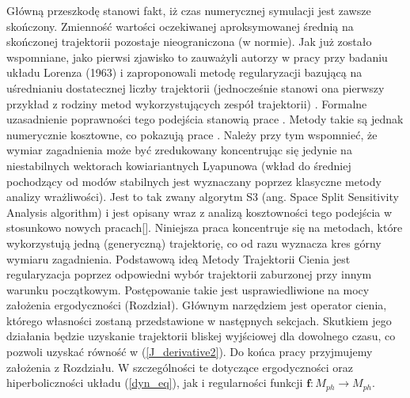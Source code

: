 \documentclass[12pt]{article}
\begin{document}
Główną przeszkodę stanowi fakt, iż czas numerycznej symulacji jest zawsze skończony. Zmienność wartości oczekiwanej aproksymowanej średnią na skończonej trajektorii pozostaje nieograniczona (w normie). Jak już zostało wspomniane, jako pierwsi zjawisko to zauważyli autorzy w pracy \cite{Lea1} przy badaniu układu Lorenza (1963) i zaproponowali metodę regularyzacji bazującą na uśrednianiu dostatecznej liczby trajektorii (jednocześnie stanowi ona pierwszy przykład z rodziny metod wykorzystujących zespół trajektorii) \cite{Lea2}. Formalne uzasadnienie poprawności tego podejścia stanowią prace \cite{Ruelle1} . Metody takie są jednak numerycznie kosztowne, co pokazują prace \cite{Chandramoorthy}. Należy przy tym wspomnieć, że wymiar zagadnienia może być zredukowany koncentrując się jedynie na niestabilnych wektorach kowiariantnych Lyapunowa (wkład do średniej pochodzący od modów stabilnych jest wyznaczany poprzez klasyczne metody analizy wrażliwości). Jest to tak zwany algorytm S3 (ang. Space Split Sensitivity Analysis algorithm) i jest opisany wraz z analizą kosztowności tego podejścia w stosunkowo nowych pracach[]. Niniejsza praca koncentruje się na metodach, które wykorzystują jedną (generyczną) trajektorię, co od razu wyznacza kres górny wymiaru zagadnienia.\newline 
Podstawową ideą Metody Trajektorii Cienia jest regularyzacja poprzez odpowiedni wybór trajektorii zaburzonej przy innym warunku początkowym. Postępowanie takie jest usprawiedliwione na mocy założenia ergodyczności (Rozdział). Głównym narzędziem jest operator cienia, którego własności zostaną przedstawione w następnych sekcjach. Skutkiem jego działania będzie uzyskanie trajektorii bliskej wyjściowej dla dowolnego czasu, co pozwoli uzyskać równość w (\ref{J_derivative2}). \newline 
Do końca pracy przyjmujemy założenia z Rozdziału. W szczególności te dotyczące ergodyczności oraz hiperboliczności układu (\ref{dyn_eq}), jak i regularności funkcji $ \textbf{f}: M_{ph} \rightarrow M_{ph}$. 
\end{document}
